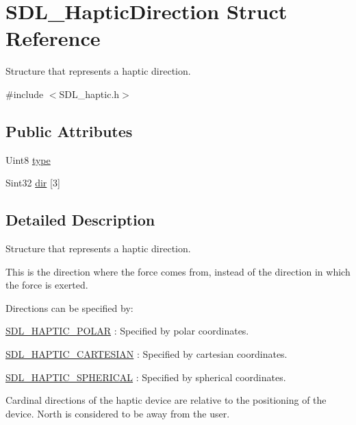 \hypertarget{structSDL__HapticDirection}{}\section{S\+D\+L\+\_\+\+Haptic\+Direction Struct Reference}
\label{structSDL__HapticDirection}


Structure that represents a haptic direction.  




{\ttfamily \#include $<$S\+D\+L\+\_\+haptic.\+h$>$}

\subsection*{Public Attributes}
\begin{DoxyCompactItemize}
\item 
Uint8 \hyperlink{structSDL__HapticDirection_acd6830ad68c4ba2af16057fa418087cc}{type}
\item 
Sint32 \hyperlink{structSDL__HapticDirection_a6cebd8118a3e61e36bd0c503ae020362}{dir} \mbox{[}3\mbox{]}
\end{DoxyCompactItemize}


\subsection{Detailed Description}
Structure that represents a haptic direction. 

This is the direction where the force comes from, instead of the direction in which the force is exerted.

Directions can be specified by\+:
\begin{DoxyItemize}
\item \hyperlink{SDL__haptic_8h_acdc35e97e5525472054a67b76e518f3b}{S\+D\+L\+\_\+\+H\+A\+P\+T\+I\+C\+\_\+\+P\+O\+L\+AR} \+: Specified by polar coordinates.
\item \hyperlink{SDL__haptic_8h_af8b2430a363a968de2a5b64c8f663d3b}{S\+D\+L\+\_\+\+H\+A\+P\+T\+I\+C\+\_\+\+C\+A\+R\+T\+E\+S\+I\+AN} \+: Specified by cartesian coordinates.
\item \hyperlink{SDL__haptic_8h_a1fcf7cb0eaf3c39b16ba266054e25aff}{S\+D\+L\+\_\+\+H\+A\+P\+T\+I\+C\+\_\+\+S\+P\+H\+E\+R\+I\+C\+AL} \+: Specified by spherical coordinates.
\end{DoxyItemize}

Cardinal directions of the haptic device are relative to the positioning of the device. North is considered to be away from the user.

